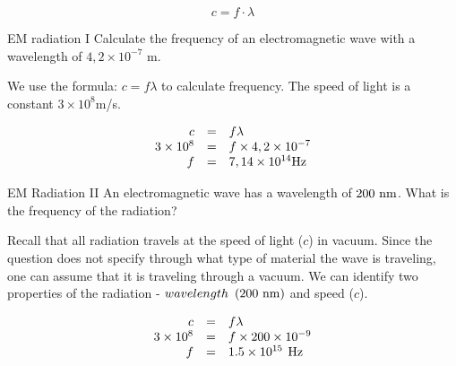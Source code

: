     \begin{equation}
    c=f\ensuremath{\cdot}\lambda
      \end{equation}
      \par
            \label{m38777*eip-923}\vspace{.5cm} 
      \noindent
      \begin{wex}{EM radiation I}{
      \label{m38777*id187899}Calculate the frequency of an electromagnetic wave with a wavelength of $4,2\ensuremath{\times}{10}^{-7}$ m.}
      { 
      \label{m38777*id187948}We use the formula: $c=f\lambda $ to calculate frequency. The speed of light is a constant $3\ensuremath{\times}{10}^{8}$m/s.\par 
    \begin{equation}
    \begin{array}{ccc}\hfill c& =& f\lambda \hfill \\ \hfill 3\ensuremath{\times}{10}^{8}& =& f\ensuremath{\times}4,2\ensuremath{\times}{10}^{-7}\hfill \\ \hfill f& =& 7,14\ensuremath{\times}{10}^{14}\mathrm{Hz}\hfill \end{array}
      \end{equation}}    \end{wex}
 
      \begin{wex}{EM Radiation II}{
      \label{m38777*id188123}An electromagnetic wave has a wavelength of $200\phantom{\rule{3.33333pt}{0ex}}\mathrm{nm}$. What is the frequency of the radiation?}{
      \label{m38777*id188341}Recall that all radiation travels at the speed of light ($c$) in vacuum.
Since the question does not specify through what type of material the wave
is traveling, one can assume that it is traveling through a vacuum.
We can identify two properties of the radiation - $wavelength\phantom{\rule{3.33333pt}{0ex}}\left(200\phantom{\rule{3.33333pt}{0ex}}\mathrm{nm}\right)$ and speed ($c$).\par 
    \begin{equation}
    \begin{array}{ccc}\hfill c& =& f\lambda \hfill \\ \hfill 3\ensuremath{\times}{10}^{8}& =& f\ensuremath{\times}200\ensuremath{\times}{10}^{-9}\hfill \\ \hfill f& =& 1.5\ensuremath{\times}{10}^{15}\phantom{\rule{4pt}{0ex}}\mathrm{Hz}\hfill \end{array}
      \end{equation}}    \end{wex}
